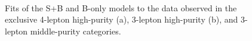 \begin{figure}[h!]
\captionsetup[subfigure]{position=b}
\centering
{}
 \\
\caption{Fits of the S+B and B-only models to the data observed in the exclusive 4-lepton high-purity (a), 3-lepton high-purity (b), and 3-lepton middle-purity categories.}
\label{fig:hmmPostcutFits}
\end{figure}


